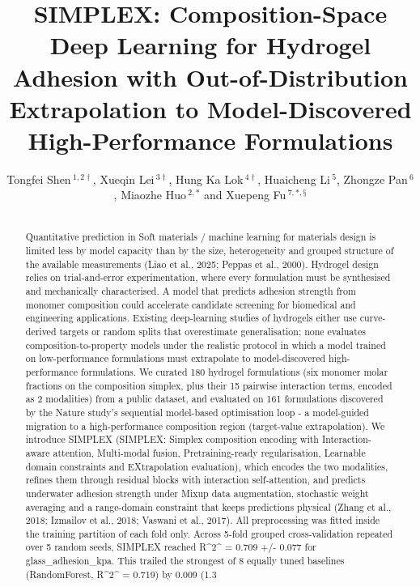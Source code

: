 \documentclass[utf8]{FrontiersinHarvard}
\def\firstAuthorLast{Shen, Lei, Hung, Li, Pan, Huo and Fu {et~al.}}
\def\Authors{Tongfei Shen\,$^{1,2\dagger}$, Xueqin Lei\,$^{3\dagger}$, Hung Ka Lok\,$^{4\dagger}$, Huaicheng Li\,$^{5}$, Zhongze Pan\,$^{6}$, Miaozhe Huo\,$^{2,*}$ and Xuepeng Fu\,$^{7,*,§}$}
\begin{document}
\onecolumn
{}

\title[SIMPLEX: composition-space deep learning for hydrogel adhesion]{SIMPLEX: Composition-Space Deep Learning for Hydrogel Adhesion with Out-of-Distribution Extrapolation to Model-Discovered High-Performance Formulations}

\author[\firstAuthorLast ]{\Authors}
\address{}
\correspondance{}
\extraAuth{}
\maketitle

\begin{abstract}
\section{}
Quantitative prediction in Soft materials / machine learning for materials design is limited less by model capacity than by the size, heterogeneity and grouped structure of the available measurements (Liao et al., 2025; Peppas et al., 2000). Hydrogel design relies on trial-and-error experimentation, where every formulation must be synthesised and mechanically characterised. A model that predicts adhesion strength from monomer composition could accelerate candidate screening for biomedical and engineering applications. Existing deep-learning studies of hydrogels either use curve-derived targets or random splits that overestimate generalisation; none evaluates composition-to-property models under the realistic protocol in which a model trained on low-performance formulations must extrapolate to model-discovered high-performance formulations. We curated 180 hydrogel formulations (six monomer molar fractions on the composition simplex, plus their 15 pairwise interaction terms, encoded as 2 modalities) from a public dataset, and evaluated on 161 formulations discovered by the Nature study's sequential model-based optimisation loop - a model-guided migration to a high-performance composition region (target-value extrapolation). We introduce SIMPLEX (SIMPLEX: Simplex composition encoding with Interaction-aware attention, Multi-modal fusion, Pretraining-ready regularisation, Learnable domain constraints and EXtrapolation evaluation), which encodes the two modalities, refines them through residual blocks with interaction self-attention, and predicts underwater adhesion strength under Mixup data augmentation, stochastic weight averaging and a range-domain constraint that keeps predictions physical (Zhang et al., 2018; Izmailov et al., 2018; Vaswani et al., 2017). All preprocessing was fitted inside the training partition of each fold only. Across 5-fold grouped cross-validation repeated over 5 random seeds, SIMPLEX reached R^2^ = 0.709 +/- 0.077 for glass_adhesion_kpa. This trailed the strongest of 8 equally tuned baselines (RandomForest, R^2^ = 0.719) by 0.009 (1.3%
\end{abstract}
\end{document}

